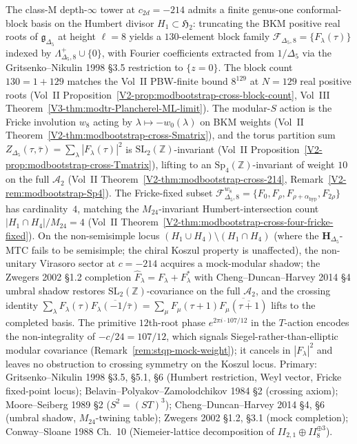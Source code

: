 \begin{remark}[Conformal-block basis at $c_{2d} = -214$ and the
crossing identity]
\label{rem:stqp-block-basis-crossing}
The class-$\mathrm M$ depth-$\infty$ tower at $c_{2d} = -214$
admits a finite genus-one conformal-block basis on the Humbert
divisor $H_1\subset\mathfrak H_2$: truncating the BKM positive
real roots of $\mathfrak g_{\Delta_5}$ at height $\ell = 8$ yields
a $130$-element block family
$\mathcal F_{\Delta_5, 8} = \{F_\lambda(\tau)\}$
indexed by $\Lambda^{+}_{\Delta_5, 8}\cup\{0\}$, with Fourier
coefficients extracted from $1/\Delta_5$ via the
Gritsenko--Nikulin 1998 \S 3.5 restriction to $\{z = 0\}$. The
block count $130 = 1 + 129$ matches the Vol~II PBW-finite bound
$8^{129}$ at $N = 129$ real positive roots (Vol~II
Proposition~\ref{V2-prop:modbootstrap-cross-block-count},
Vol~III Theorem~\ref{V3-thm:modtr-Plancherel-ML-limit}).
The modular-$S$ action is the Fricke involution $w_8$ acting by
$\lambda\mapsto -w_0(\lambda)$ on BKM weights (Vol~II
Theorem~\ref{V2-thm:modbootstrap-cross-Smatrix}), and the
torus partition sum
$Z_{\Delta_5}(\tau,\bar\tau) = \sum_\lambda |F_\lambda(\tau)|^2$
is $\mathrm{SL}_2(\mathbb Z)$-invariant
(Vol~II Proposition~\ref{V2-prop:modbootstrap-cross-Tmatrix}),
lifting to an $\mathrm{Sp}_4(\mathbb Z)$-invariant of weight
$10$ on the full $\mathcal A_2$
(Vol~II Theorem~\ref{V2-thm:modbootstrap-cross-214},
Remark~\ref{V2-rem:modbootstrap-Sp4}).
The Fricke-fixed subset
$\mathcal F^{w_8}_{\Delta_5, 8} =
\{F_0, F_\rho, F_{\rho + \alpha_{\mathrm{hyp}}}, F_{2\rho}\}$
has cardinality~$4$, matching the
$M_{24}$-invariant Humbert-intersection count
$|H_1\cap H_4|/M_{24} = 4$
(Vol~II
Theorem~\ref{V2-thm:modbootstrap-cross-four-fricke-fixed}).
On the non-semisimple locus
$(H_1\cup H_4)\setminus(H_1\cap H_4)$ (where the
$\mathbf H_{\Delta_5}$-MTC fails to be semisimple; the chiral
Koszul property is unaffected),
the non-unitary Virasoro sector at $c = -214$ acquires a
mock-modular shadow; the Zwegers 2002 \S 1.2 completion
$\widehat F_\lambda = F_\lambda + F_\lambda^*$ with
Cheng--Duncan--Harvey 2014 \S 4 umbral shadow restores
$\mathrm{SL}_2(\mathbb Z)$-covariance on the full
$\mathcal A_2$, and the crossing identity
$\sum_\lambda F_\lambda(\tau)\overline{F_\lambda(-1/\bar\tau)}
= \sum_\mu F_\mu(\tau+1)\overline{F_\mu(\overline{\tau+1})}$
lifts to the completed basis.
The primitive $12$th-root phase $e^{2\pi i\cdot 107/12}$ in the
$T$-action encodes the non-integrality of $-c/24 = 107/12$, which
signals Siegel-rather-than-elliptic modular covariance
(Remark~\ref{rem:stqp-mock-weight}); it cancels in $|F_\lambda|^2$
and leaves no obstruction to crossing symmetry on the Koszul
locus.
Primary: Gritsenko--Nikulin 1998 \S 3.5, \S 5.1, \S 6
(Humbert restriction, Weyl vector, Fricke fixed-point locus);
Belavin--Polyakov--Zamolodchikov 1984 \S 2 (crossing axiom);
Moore--Seiberg 1989 \S 2 ($S^2 = (ST)^3$);
Cheng--Duncan--Harvey 2014 \S 4, \S 6
(umbral shadow, $M_{24}$-twining table);
Zwegers 2002 \S 1.2, \S 3.1 (mock completion);
Conway--Sloane 1988 Ch.~10 (Niemeier-lattice decomposition of
$II_{2,1}\oplus II_8^{\oplus 3}$).
\end{remark}

